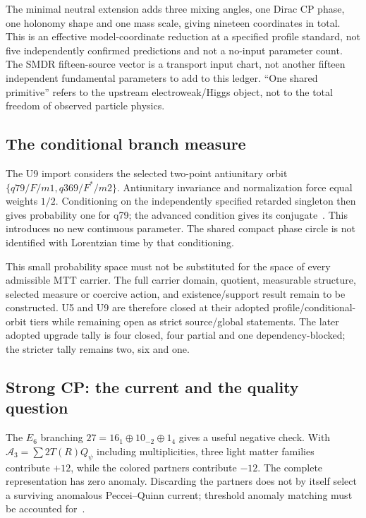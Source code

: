 \documentclass[11pt]{article}
\begin{document}
The minimal neutral extension adds three mixing angles, one Dirac CP phase, one holonomy
shape and one mass scale, giving nineteen coordinates in total.  This is an effective
model-coordinate reduction at a specified profile standard, not five independently
confirmed predictions and not a no-input parameter count.  The SMDR fifteen-source vector
is a transport input chart, not another fifteen independent fundamental parameters to add
to this ledger.  ``One shared primitive'' refers to the upstream electroweak/Higgs object,
not to the total freedom of observed particle physics.

\subsection{The conditional branch measure}

The U9 import considers the selected two-point antiunitary orbit
$\{q79/F/m1,q369/F^*/m2\}$.  Antiunitary invariance and normalization force equal weights
$1/2$.  Conditioning on the independently specified retarded singleton then gives
probability one for q79; the advanced condition gives its conjugate~\cite{SMNeutralBranch}.
This introduces no new continuous parameter.  The shared compact phase circle is not
identified with Lorentzian time by that conditioning.

This small probability space must not be substituted for the space of every admissible MTT
carrier.  The full carrier domain, quotient, measurable structure, selected measure or
coercive action, and existence/support result remain to be constructed.  U5 and U9 are
therefore closed at their adopted profile/conditional-orbit tiers while remaining open as
strict source/global statements.  The later adopted upgrade tally is four closed, four
partial and one dependency-blocked; the stricter tally remains two, six and one.

\subsection{Strong CP: the current and the quality question}

The $E_6$ branching $27=16_1\oplus10_{-2}\oplus1_4$ gives a useful negative check.
With $\mathcal A_3=\sum 2T(R)Q_\psi$ including multiplicities, three light matter families
contribute $+12$, while the colored partners contribute $-12$.  The complete representation
has zero anomaly.  Discarding the partners does not by itself select a surviving anomalous
Peccei--Quinn current; threshold anomaly matching must be accounted for~\cite{SMAxion}.
\end{document}
